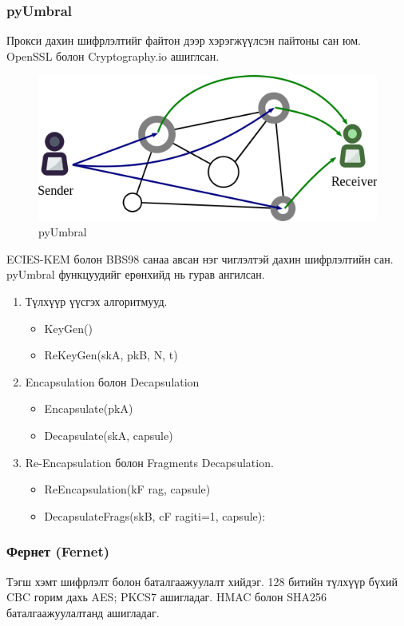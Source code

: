 \subsubsection*{pyUmbral}
Прокси дахин шифрлэлтийг файтон дээр хэрэгжүүлсэн пайтоны сан юм. OpenSSL болон Cryptography.io ашиглсан.
\begin{figure}[ht]
    \centering
    \includegraphics[scale=0.5]{Figures/umbral.png}
    \caption[pyUmbral]{pyUmbral}
    \label{fig:pyUmbral}
\end{figure}

ECIES-KEM болон BBS98 санаа авсан нэг чиглэлтэй дахин шифрлэлтийн сан. pyUmbral функцуудийг ерөнхийд нь гурав ангилсан.
\begin{enumerate}
    \item Түлхүүр үүсгэх алгоритмууд.
          \begin{itemize}
              \item KeyGen()
              \item ReKeyGen(skA, pkB, N, t)
          \end{itemize}
    \item Encapsulation болон Decapsulation
          \begin{itemize}
              \item Encapsulate(pkA)
              \item Decapsulate(skA, capsule)
          \end{itemize}
    \item Re-Encapsulation болон Fragments Decapsulation.
          \begin{itemize}
              \item ReEncapsulation(kF rag, capsule)
              \item DecapsulateFrags(skB, {cF ragi}ti=1, capsule):
          \end{itemize}
\end{enumerate}

\subsubsection*{Фернет (Fernet)}
Тэгш хэмт шифрлэлт  болон баталгаажуулалт хийдэг. 128 битийн түлхүүр бүхий CBC горим дахь AES; PKCS7 ашигладаг. HMAC болон SHA256 баталгаажуулалтанд ашигладаг.

